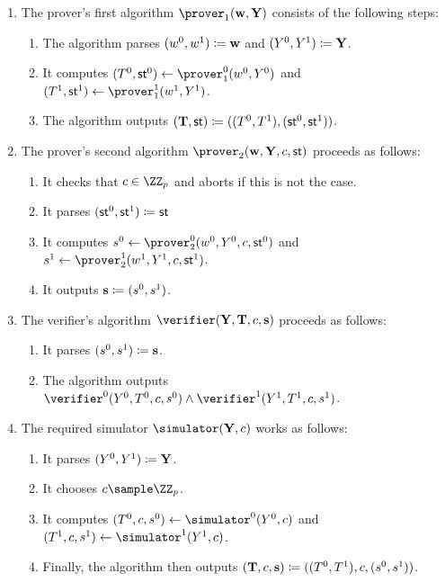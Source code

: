 \documentclass[runningheads,11pt]{article}
\begin{document}
\begin{enumerate}
  \item
    The prover's first algorithm $\prover_1(\vec \witness, \vec\statement)$ consists of the following steps:
    \begin{enumerate}
      \item
        The algorithm parses $(w^0,w^1)\coloneqq \mathbf {w}$ and $(Y^0,Y^1)\coloneqq \mathbf {Y}$.
      \item
        It computes $(\commitment^0,\st^0)\gets\prover_1^0(\witness^0, \statement^0)$ and $(\commitment^1,\st^1)\gets\prover_1^1(\witness^1, \statement^1)$.
      \item
	The algorithm outputs $(\mathbf {T},\mathsf{st}) \coloneqq ((T^0,  T^1),(\mathsf{st}^0,\mathsf{st}^1))$.
    \end{enumerate}
  \item
    The prover's second algorithm $\prover_2(\vec \witness,\vec \statement,\challenge,\st)$ proceeds as follows:
    \begin{enumerate}
      \item
        It checks that $c\in\ZZ_p$ and aborts if this is not the case.
      \item
	It parses $(\mathsf{st}^0,\mathsf{st}^1)\coloneqq \mathsf{st}$
      \item
        It computes $s^0\gets\prover_2^0(\witness^0,\statement^0,\challenge,\st^0)$ and $s^1\gets\prover_2^1(\witness^1,\statement^1,\challenge,\st^1)$.
      \item
        It outputs $\mathbf {s}\coloneqq(s^0,s^1)$.
    \end{enumerate}
  \item
    The verifier's algorithm $\verifier(\vec \statement, \vec \commitment,\challenge,\vec \response)$ proceeds as follows:
    \begin{enumerate}
      \item
        It  parses $(s^0,s^1)\coloneqq \mathbf {s}$.
      \item
	The algorithm outputs $\verifier^0(\statement^0, \commitment^0,\challenge, \response^0)\land\verifier^1(\statement^1, \commitment^1,\challenge, \response^1)$.
    \end{enumerate}
  \item
    The required simulator $\simulator(\vec Y,c)$ works as follows:
    \begin{enumerate}
      \item
        It parses $(Y^0,Y^1)\coloneqq \mathbf Y$.
      \item
        It chooses $c\sample\ZZ_p$.
      \item
        It computes $(\commitment^0,\challenge,s^0)\gets\simulator^0(\statement^0,c)$ and $(\commitment^1,\challenge,s^1)\gets\simulator^1(\statement^1,c)$.
      \item
        Finally, the algorithm then outputs $(\mathbf {T},c, \mathbf {s})\coloneqq((T^0, T^1),c,(s^0,s^1))$.
    \end{enumerate}
\end{enumerate}
\end{document}
